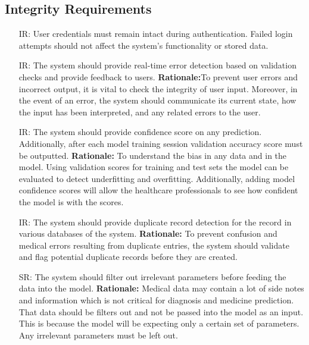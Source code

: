 \documentclass{article}
\newcounter{irnum} %
\newcounter{srnum} %
\begin{document}
\subsection{Integrity Requirements}
\begin{itemize}
    \item [IR\refstepcounter{irnum}\theirnum \label{IR_Autentication}:] User credentials must remain intact during authentication. Failed login attempts should not affect the system's functionality or stored data.

    \item [IR\refstepcounter{irnum}\theirnum \label{IR_ErrorDetection}:] The system should provide real-time error detection based on validation checks and provide feedback to users.
    \textbf{Rationale:}To prevent user errors and incorrect output, it is vital to check the integrity of user input. Moreover, in the event of an error, the system should communicate its current state, how the input has been interpreted, and any related errors to the user.

    \item [IR\refstepcounter{irnum}\theirnum \label{IR_ValidationScore}:] The system should provide confidence score on any prediction. Additionally, after each model training session validation accuracy score must be outputted.
    \textbf{Rationale:} To understand the bias in any data and in the model. Using validation scores for training and test sets the model can be evaluated to detect underfitting and overfitting. Additionally, adding model confidence scores will allow  the healthcare professionals to see how confident the model is with the scores.
    
    \item [IR\refstepcounter{irnum}\theirnum \label{IR_DuplicateRecordDetection}:] The system should provide duplicate record detection for the record in various databases of the system.
    \textbf{Rationale:} To prevent confusion and medical errors resulting from duplicate entries, the system should validate and flag potential duplicate records before they are created.

    \item [SR\refstepcounter{irnum}\thesrnum \label{IR_InputCheck}:] The system should filter out irrelevant parameters before feeding the data into the model. 
    \textbf{Rationale:} Medical data may contain a lot of side notes and information which is not critical for diagnosis and medicine prediction. That data should be filters out and not be passed into the model as an input. This is because the model will be expecting only a certain set of parameters. Any irrelevant parameters must be left out. 

\end{itemize}
\end{document}

